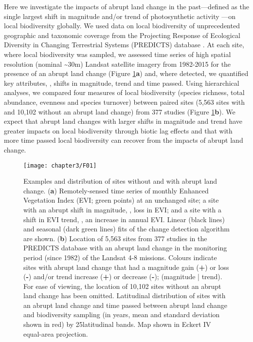 Here we investigate the impacts of abrupt land change in the past—defined as the single largest shift in magnitude and/or trend of photosynthetic activity \citep{Verbesselt2010a,DeJong2013,Song2018}—on local biodiversity globally. We used data on local biodiversity of unprecedented geographic and taxonomic coverage from the Projecting Response of Ecological Diversity in Changing Terrestrial Systems (PREDICTS) database \citep{Hudson2016}. At each site, where local biodiversity was sampled, we assessed time series of high spatial resolution (nominal \textasciitilde30m) Landsat satellite imagery from 1982-2015 for the presence of an abrupt land change (Figure \ref{F03_01}\textbf{a}) and, where detected, we quantified key attributes, \ie, shifts in magnitude, trend and time passed. Using hierarchical analyses, we compared four measures of local biodiversity (species richness, total abundance, evenness and species turnover) between paired sites (5,563 sites with and 10,102 without an abrupt land change) from 377 studies (Figure \ref{F03_01}\textbf{b}). We expect that abrupt land changes with larger shifts in magnitude and trend have greater impacts on local biodiversity through biotic lag effects and that with more time passed local biodiversity can recover from the impacts of abrupt land change.

\begin{figure}[!htb]
\centering
\texttt{[image: chapter3/F01]}
\caption{ Examples and distribution of sites without and with abrupt land change. (\textbf{a}) Remotely-sensed time series of monthly Enhanced Vegetation Index (EVI; green points) at an unchanged site; a site with an abrupt shift in magnitude, \ie, loss in EVI; and a site with a shift in EVI trend, \ie, an increase in annual EVI. Linear (black lines) and seasonal (dark green lines) fits of the change detection algorithm \citep{Verbesselt2010a} are shown. (\textbf{b}) Location of 5,563 sites from 377 studies in the PREDICTS database with an abrupt land change in the monitoring period (since 1982) of the Landsat 4-8 missions. Colours indicate sites with abrupt land change that had a magnitude gain (\textbf{+}) or loss (\textbf{-}) and/or trend increase (\textbf{+}) or decrease (\textbf{-}); (magnitude | trend). For ease of viewing, the location of 10,102 sites without an abrupt land change has been omitted. Latitudinal distribution of sites with an abrupt land change and time passed between abrupt land change and biodiversity sampling (in years, mean and standard deviation shown in red) by 25\textdegree  latitudinal bands. Map shown in Eckert IV equal-area projection.}
\label{F03_01}
\end{figure}
\clearpage %

